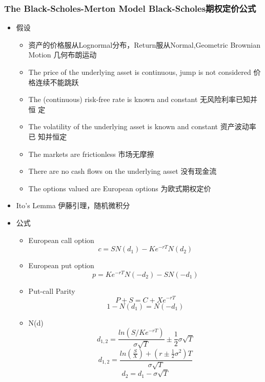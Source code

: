 \documentclass[a4paper,6pt,twoside,openany]{article}
\begin{document}
\subsubsection{The Black-Scholes-Merton Model Black-Scholes期权定价公式}
\begin{itemize}
\item 假设
  \begin{itemize}
  \item 资产的价格服从Lognormal分布，Return服从Normal,Geometric Brownian Motion
    几何布朗运动
  \item The price of the underlying asset is continuous, jump is not considered
    价格连续不能跳跃
  \item The (continuous) risk-free rate is known and constant 无风险利率已知并恒
    定
  \item The volatility of the underlying asset is known and constant 资产波动率已
    知并恒定
  \item The markets are frictionless 市场无摩擦
  \item There are no cash flows on the underlying asset 没有现金流
  \item The options valued are European options 为欧式期权定价
  \end{itemize}
\item Ito's Lemma 伊藤引理，随机微积分
\item 公式
  \begin{itemize}
  \item European call option $$c=SN(d_{1}) - Ke^{-rT}N(d_{2})$$
  \item European put option $$p= Ke^{-rT}N(-d_{2}) - SN(-d_{1})$$
  \item Put-call Parity $$P+ S = C+ Xe^{-rT}$$ $$1 - N(d_{1}) = N(-d_{1})$$
  \item N(d) $$d_{1,2} = \frac{ln(S/Ke^{-rT})}{\sigma \sqrt{T}} \pm
    \frac{1}{2}\sigma \sqrt{T}$$
    $$d_{1,2}= \frac{ln(\frac{S}{X}) +(r \pm \frac{1}{2}\sigma^{2})T}{\sigma \sqrt T}$$
    $$d_{2} = d_{1} - \sigma \sqrt{T}$$
             

\end{itemize}
\end{itemize}
\end{document}
